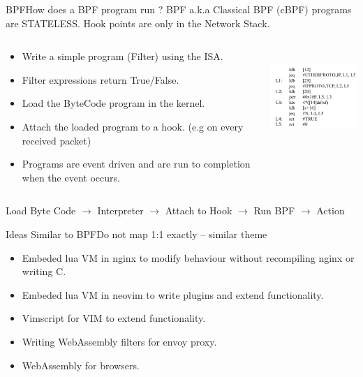 \documentclass{beamer}
\begin{document}
\begin{frame}{BPF}{How does a BPF program run ?}
BPF a.k.a Classical BPF (cBPF) programs are STATELESS.\newline
Hook points are \alert{only} in the \alert{Network Stack}.
\begin{columns}
\begin{column}{0.6\textwidth}
\begin{itemize}
    \item Write a simple program (Filter) using the ISA.
    \item Filter expressions return True/False.
    \item \alert{Load} the ByteCode program in the kernel.
    \item \alert{Attach} the loaded program to a hook. (e.g on every received packet)
    \item Programs are \alert{event driven} and are \alert{run to completion} when the event occurs.
\end{itemize}
\end{column}
\begin{column}{0.4\textwidth}
    \includegraphics[height=3.5cm]{filter.png}
\end{column}

\end{columns}

\begin{exampleblock}

Load Byte Code $\rightarrow$ Interpreter $\rightarrow$ Attach to Hook $\rightarrow$ Run BPF $\rightarrow$ Action
\end{exampleblock}
\end{frame}

\begin{frame}{Ideas Similar to BPF}{Do not map 1:1 exactly -- similar theme}
\Large
\begin{itemize}
    \item Embeded \alert{lua} VM in nginx to modify behaviour without recompiling nginx or writing C.
    \item Embeded \alert{lua} VM in neovim to write plugins and extend functionality.
    \item Vimscript for VIM to extend functionality.
    \item Writing WebAssembly filters for \alert{envoy} proxy.
    \item WebAssembly for browsers.
\end{itemize}
    
\end{frame}
\end{document}
